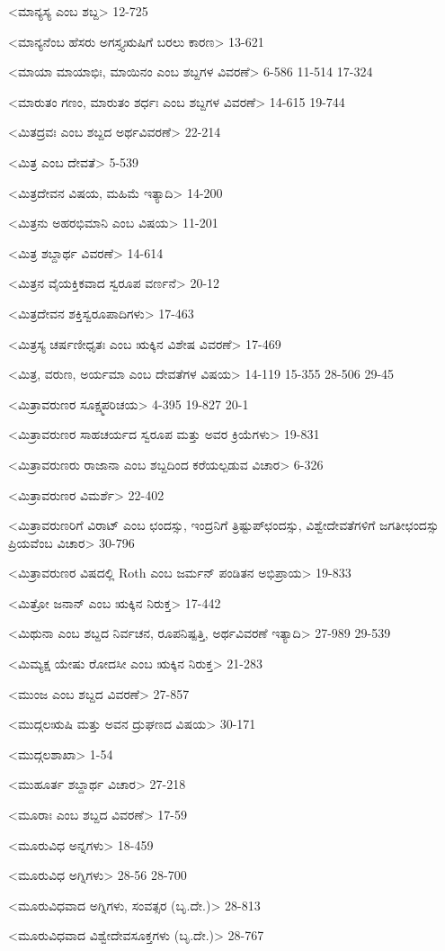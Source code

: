 <ಮಾನ್ಯಸ್ಯ ಎಂಬ ಶಬ್ದ>
12-725

<ಮಾನ್ಯನೆಂಬ ಹೆಸರು ಅಗಸ್ತ್ಯಋಷಿಗೆ ಬರಲು ಕಾರಣ>
13-621

<ಮಾಯಾ ಮಾಯಾಭಿಃ, ಮಾಯಿನಂ ಎಂಬ ಶಬ್ದಗಳ ವಿವರಣೆ>
6-586 
11-514
17-324

<ಮಾರುತಂ ಗಣಂ, ಮಾರುತಂ ಶರ್ಧಃ ಎಂಬ ಶಬ್ದಗಳ ವಿವರಣೆ>
14-615
19-744

<ಮಿತದ್ರವಃ ಎಂಬ ಶಬ್ದದ ಅರ್ಥವಿವರಣೆ>
22-214

<ಮಿತ್ರ ಎಂಬ ದೇವತೆ>
5-539

<ಮಿತ್ರದೇವನ ವಿಷಯ, ಮಹಿಮೆ ಇತ್ಯಾದಿ>
14-200

<ಮಿತ್ರನು ಅಹರಭಿಮಾನಿ ಎಂಬ ವಿಷಯ>
11-201

<ಮಿತ್ರ ಶಬ್ದಾರ್ಥ ವಿವರಣೆ>
14-614

<ಮಿತ್ರನ ವೈಯಕ್ತಿಕವಾದ ಸ್ವರೂಪ ವರ್ಣನೆ>
20-12

<ಮಿತ್ರದೇವನ ಶಕ್ತಿಸ್ವರೂಪಾದಿಗಳು>
17-463

<ಮಿತ್ರಸ್ಯ ಚರ್ಷಣೀಧೃತಃ ಎಂಬ ಋಕ್ಕಿನ ವಿಶೇಷ ವಿವರಣೆ>
17-469

<ಮಿತ್ರ, ವರುಣ, ಅರ್ಯಮಾ ಎಂಬ ದೇವತೆಗಳ ವಿಷಯ>
14-119
15-355 
28-506
29-45

<ಮಿತ್ರಾವರುಣರ ಸೂಕ್ಷ್ಮಪರಿಚಯ>
4-395
19-827
20-1

<ಮಿತ್ರಾವರುಣರ ಸಾಹಚರ್ಯದ ಸ್ವರೂಪ ಮತ್ತು ಅವರ ಕ್ರಿಯೆಗಳು>
19-831

<ಮಿತ್ರಾವರುಣರು ರಾಜಾನಾ ಎಂಬ ಶಬ್ದದಿಂದ ಕರೆಯಲ್ಪಡುವ ವಿಚಾರ>
6-326

<ಮಿತ್ರಾವರುಣರ ವಿಮರ್ಶೆ>
22-402

<ಮಿತ್ರಾವರುಣರಿಗೆ ವಿರಾಟ್‍ ಎಂಬ ಛಂದಸ್ಸು, ಇಂದ್ರನಿಗೆ ತ್ರಿಷ್ಟುಪ್‍ಛಂದಸ್ಸು, ವಿಶ್ವೇದೇವತೆಗಳಿಗೆ ಜಗತೀಛಂದಸ್ಸು ಪ್ರಿಯವೆಂಬ ವಿಚಾರ>
30-796

<ಮಿತ್ರಾವರುಣರ ವಿಷದಲ್ಲಿ Roth ಎಂಬ ಜರ್ಮನ್‍ ಪಂಡಿತನ ಅಭಿಪ್ರಾಯ>
19-833

<ಮಿತ್ರೋ ಜನಾನ್‍ ಎಂಬ ಋಕ್ಕಿನ ನಿರುಕ್ತ>
17-442

<ಮಿಥುನಾ ಎಂಬ ಶಬ್ದದ ನಿರ್ವಚನ, ರೂಪನಿಷ್ಪತ್ತಿ, ಅರ್ಥವಿವರಣೆ ಇತ್ಯಾದಿ>
27-989
29-539

<ಮಿಮ್ಯಕ್ಷ ಯೇಷು ರೋದಸೀ ಎಂಬ ಋಕ್ಕಿನ ನಿರುಕ್ತ>
21-283

<ಮುಂಜ ಎಂಬ ಶಬ್ದದ ವಿವರಣೆ>
27-857

<ಮುದ್ಗಲಋಷಿ ಮತ್ತು ಅವನ ದ್ರುಘಣದ ವಿಷಯ>
30-171

<ಮುದ್ಗಲಶಾಖಾ>
1-54

<ಮುಹೂರ್ತ ಶಬ್ದಾರ್ಥ ವಿಚಾರ>
27-218

<ಮೂರಾಃ ಎಂಬ ಶಬ್ದದ ವಿವರಣೆ>
17-59

<ಮೂರುವಿಧ ಅನ್ನಗಳು>
18-459

<ಮೂರುವಿಧ ಅಗ್ನಿಗಳು>
28-56 
28-700

<ಮೂರುವಿಧವಾದ ಅಗ್ನಿಗಳು, ಸಂವತ್ಸರ (ಬೃ.ದೇ.)>
28-813

<ಮೂರುವಿಧವಾದ ವಿಶ್ವೇದೇವಸೂಕ್ತಗಳು (ಬೃ.ದೇ.)>
28-767

